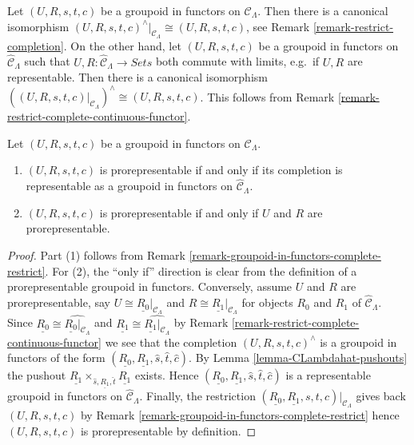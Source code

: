 \begin{remark}
\label{remark-groupoid-in-functors-complete-restrict}
Let $(U, R, s, t, c)$ be a groupoid in functors on $\mathcal{C}_\Lambda$.
Then there is a canonical isomorphism
$(U, R, s, t, c)^{\wedge}|_{\mathcal{C}_\Lambda} \cong (U, R, s, t, c)$, see
Remark \ref{remark-restrict-completion}.
On the other hand, let $(U,R,s,t,c)$ be a groupoid in functors on
$\widehat{\mathcal{C}}_\Lambda$ such that
$U, R : \widehat{\mathcal{C}}_\Lambda \to \textit{Sets}$
both commute with limits, e.g.\ if $U, R$ are representable.
Then there is a canonical isomorphism
$((U, R, s, t, c)|_{\mathcal{C}_\Lambda})^{\wedge} \cong (U, R, s, t, c)$.
This follows from
Remark \ref{remark-restrict-complete-continuous-functor}.
\end{remark}

\begin{lemma}
\label{lemma-groupoid-in-functors-prorep-equivalences}
Let $(U, R, s, t, c)$ be a groupoid in functors on $\mathcal{C}_\Lambda$.
\begin{enumerate}
\item $(U, R, s, t, c)$ is prorepresentable if and only if its completion is 
representable as a groupoid in functors on $\widehat{\mathcal{C}}_\Lambda$.
\item $(U, R, s, t, c)$ is prorepresentable if and only if $U$ and $R$ are
prorepresentable.
\end{enumerate}
\end{lemma}

\begin{proof}
Part (1) follows from
Remark \ref{remark-groupoid-in-functors-complete-restrict}.
For (2), the ``only if'' direction is clear from the definition
of a prorepresentable groupoid in functors. Conversely, assume $U$ and $R$
are prorepresentable, say $U \cong \underline{R_0}|_{\mathcal{C}_\Lambda}$
and $R \cong \underline{R_1}|_{\mathcal{C}_\Lambda}$ for objects $R_0$ and
$R_1$ of $\widehat{\mathcal{C}}_\Lambda$.
Since $\underline{R_0} \cong \widehat{\underline{R_0}|_{\mathcal{C}_\Lambda}}$
and $\underline{R_1} \cong \widehat{\underline{R_1}|_{\mathcal{C}_\Lambda}}$
by
Remark \ref{remark-restrict-complete-continuous-functor}
we see that the completion $(U, R, s, t, c)^\wedge$ is a groupoid in
functors of the form
$(\underline{R_0}, \underline{R_1}, \widehat{s}, \widehat{t}, \widehat{c})$.
By
Lemma \ref{lemma-CLambdahat-pushouts}
the pushout
$\underline{R_1} \times_{\widehat{s}, \underline{R_1}, \widehat{t}}
\underline{R_1}$ exists. Hence
$(\underline{R_0}, \underline{R_1}, \widehat{s}, \widehat{t}, \widehat{c})$
is a representable groupoid in functors on $\widehat{\mathcal{C}}_\Lambda$.
Finally, the restriction
$(\underline{R_0}, \underline{R_1}, s,t,c)|_{\mathcal{C}_\Lambda}$
gives back $(U, R, s, t, c)$ by
Remark \ref{remark-groupoid-in-functors-complete-restrict}
hence $(U, R, s, t, c)$ is prorepresentable by definition.
\end{proof}






